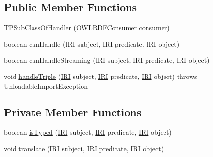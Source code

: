 \subsection*{Public Member Functions}
\begin{DoxyCompactItemize}
\item 
\hyperlink{classorg_1_1coode_1_1owlapi_1_1rdfxml_1_1parser_1_1_t_p_sub_class_of_handler_a30f722c60654d1c4203fc6e7a626ccbe}{T\-P\-Sub\-Class\-Of\-Handler} (\hyperlink{classorg_1_1coode_1_1owlapi_1_1rdfxml_1_1parser_1_1_o_w_l_r_d_f_consumer}{O\-W\-L\-R\-D\-F\-Consumer} \hyperlink{classorg_1_1coode_1_1owlapi_1_1rdfxml_1_1parser_1_1_abstract_triple_handler_a4ccf4d898ff01eb1cadfa04b23d54e9c}{consumer})
\item 
boolean \hyperlink{classorg_1_1coode_1_1owlapi_1_1rdfxml_1_1parser_1_1_t_p_sub_class_of_handler_ae6ad8065cb74bab3e4c821302e1454ba}{can\-Handle} (\hyperlink{classorg_1_1semanticweb_1_1owlapi_1_1model_1_1_i_r_i}{I\-R\-I} subject, \hyperlink{classorg_1_1semanticweb_1_1owlapi_1_1model_1_1_i_r_i}{I\-R\-I} predicate, \hyperlink{classorg_1_1semanticweb_1_1owlapi_1_1model_1_1_i_r_i}{I\-R\-I} object)
\item 
boolean \hyperlink{classorg_1_1coode_1_1owlapi_1_1rdfxml_1_1parser_1_1_t_p_sub_class_of_handler_a823e592a2071c29c4d7912f04c631cc2}{can\-Handle\-Streaming} (\hyperlink{classorg_1_1semanticweb_1_1owlapi_1_1model_1_1_i_r_i}{I\-R\-I} subject, \hyperlink{classorg_1_1semanticweb_1_1owlapi_1_1model_1_1_i_r_i}{I\-R\-I} predicate, \hyperlink{classorg_1_1semanticweb_1_1owlapi_1_1model_1_1_i_r_i}{I\-R\-I} object)
\item 
void \hyperlink{classorg_1_1coode_1_1owlapi_1_1rdfxml_1_1parser_1_1_t_p_sub_class_of_handler_a58309ec27626458b5b101b691fa315f7}{handle\-Triple} (\hyperlink{classorg_1_1semanticweb_1_1owlapi_1_1model_1_1_i_r_i}{I\-R\-I} subject, \hyperlink{classorg_1_1semanticweb_1_1owlapi_1_1model_1_1_i_r_i}{I\-R\-I} predicate, \hyperlink{classorg_1_1semanticweb_1_1owlapi_1_1model_1_1_i_r_i}{I\-R\-I} object)  throws Unloadable\-Import\-Exception 
\end{DoxyCompactItemize}
\subsection*{Private Member Functions}
\begin{DoxyCompactItemize}
\item 
boolean \hyperlink{classorg_1_1coode_1_1owlapi_1_1rdfxml_1_1parser_1_1_t_p_sub_class_of_handler_aaad96dbdd0b0b901876f23e299b8cb0c}{is\-Typed} (\hyperlink{classorg_1_1semanticweb_1_1owlapi_1_1model_1_1_i_r_i}{I\-R\-I} subject, \hyperlink{classorg_1_1semanticweb_1_1owlapi_1_1model_1_1_i_r_i}{I\-R\-I} predicate, \hyperlink{classorg_1_1semanticweb_1_1owlapi_1_1model_1_1_i_r_i}{I\-R\-I} object)
\item 
void \hyperlink{classorg_1_1coode_1_1owlapi_1_1rdfxml_1_1parser_1_1_t_p_sub_class_of_handler_a271a31487b925d45308d563795cfe12a}{translate} (\hyperlink{classorg_1_1semanticweb_1_1owlapi_1_1model_1_1_i_r_i}{I\-R\-I} subject, \hyperlink{classorg_1_1semanticweb_1_1owlapi_1_1model_1_1_i_r_i}{I\-R\-I} predicate, \hyperlink{classorg_1_1semanticweb_1_1owlapi_1_1model_1_1_i_r_i}{I\-R\-I} object)
\end{DoxyCompactItemize}
